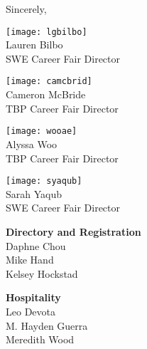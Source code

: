 \documentclass[twoside]{article}
\begin{document}
    Sincerely, \begin{multicols}{2}
    \begin{minipage}{\columnwidth}
            \texttt{[image: lgbilbo]}\\
            Lauren Bilbo\\
            SWE Career Fair Director\\
            \end{minipage}
\begin{minipage}{\columnwidth}
            \texttt{[image: camcbrid]}\\
            Cameron McBride\\
            TBP Career Fair Director\\
            \end{minipage}
\begin{minipage}{\columnwidth}
            \texttt{[image: wooae]}\\
            Alyssa Woo\\
            TBP Career Fair Director\\
            \end{minipage}
\begin{minipage}{\columnwidth}
            \texttt{[image: syaqub]}\\
            Sarah Yaqub\\
            SWE Career Fair Director\\
            \end{minipage}
\end{multicols}\begin{multicols}{2}
    \begin{minipage}{\columnwidth}
    {\bf Directory and Registration}\\
    Daphne Chou\\
    Mike Hand\\
    Kelsey Hockstad\\
    
\end{minipage}
    \begin{minipage}{\columnwidth}
    {\bf Hospitality}\\
    Leo Devota\\
    M. Hayden Guerra\\
    Meredith Wood\\
    

\end{minipage}
\end{multicols}
\end{document}
